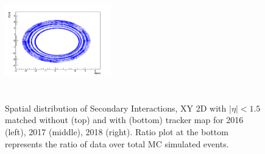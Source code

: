 \documentclass{cernatlasnote}
\begin{document}
\begin{figure}[htp]
 \includegraphics[width=4.6cm, height=4.4cm]{images/emu_channel/2018/18_2D_plots/SecInt18_XY_4_r1p5_matched.png}\\
 \caption{Spatial distribution of Secondary Interactions, XY 2D with $|\eta| < 1.5$ matched without (top) and with (bottom) tracker map for 2016 (left), 2017 (middle), 2018 (right). Ratio plot at the bottom represents the ratio of data over total MC simulated events.}
 \label{fig:L0DATAMC}
  \end{figure}
\end{document}
